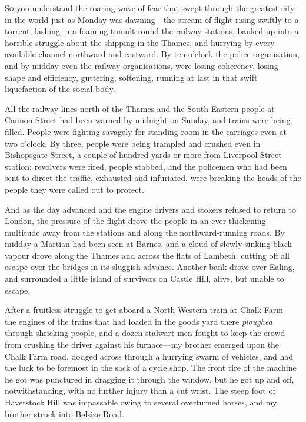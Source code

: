 



\lettrine[lines=4]{S}{o} you understand the roaring wave of fear that swept through the greatest city in the world just as Monday was dawning—the stream of flight rising swiftly to a torrent, lashing in a foaming tumult round the railway stations, banked up into a horrible struggle about the shipping in the Thames, and hurrying by every available channel northward and eastward. By ten o'clock the police organisation, and by midday even the railway organisations, were losing coherency, losing shape and efficiency, guttering, softening, running at last in that swift liquefaction of the social body.

All the railway lines north of the Thames and the South-Eastern people at Cannon Street had been warned by midnight on Sunday, and trains were being filled. People were fighting savagely for standing-room in the carriages even at two o'clock. By three, people were being trampled and crushed even in Bishopsgate Street, a couple of hundred yards or more from Liverpool Street station; revolvers were fired, people stabbed, and the policemen who had been sent to direct the traffic, exhausted and infuriated, were breaking the heads of the people they were called out to protect.

And as the day advanced and the engine drivers and stokers refused to return to London, the pressure of the flight drove the people in an ever-thickening multitude away from the stations and along the northward-running roads. By midday a Martian had been seen at Barnes, and a cloud of slowly sinking black vapour drove along the Thames and across the flats of Lambeth, cutting off all escape over the bridges in its sluggish advance. Another bank drove over Ealing, and surrounded a little island of survivors on Castle Hill, alive, but unable to escape.

After a fruitless struggle to get aboard a North-Western train at Chalk Farm—the engines of the trains that had loaded in the goods yard there \textit{ploughed} through shrieking people, and a dozen stalwart men fought to keep the crowd from crushing the driver against his furnace—my brother emerged upon the Chalk Farm road, dodged across through a hurrying swarm of vehicles, and had the luck to be foremost in the sack of a cycle shop. The front tire of the machine he got was punctured in dragging it through the window, but he got up and off, notwithstanding, with no further injury than a cut wrist. The steep foot of Haverstock Hill was impassable owing to several overturned horses, and my brother struck into Belsize Road.

